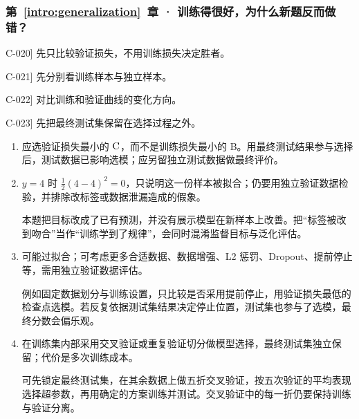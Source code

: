 \subsubsection*{第~\ref*{intro:generalization}~章 · 训练得很好，为什么新题反而做错？}
\begin{answerhints}
\item[\hyperref[exercise:validation-checkpoint-choice]{C-020}] \leavevmode{}\label{hint:validation-checkpoint-choice}先只比较验证损失，不用训练损失决定胜者。
\item[\hyperref[exercise:zero-loss-generalization]{C-021}] \leavevmode{}\label{hint:zero-loss-generalization}先分别看训练样本与独立样本。
\item[\hyperref[exercise:validation-overfitting]{C-022}] \leavevmode{}\label{hint:validation-overfitting}对比训练和验证曲线的变化方向。
\item[\hyperref[exercise:small-data-validation]{C-023}] \leavevmode{}\label{hint:small-data-validation}先把最终测试集保留在选择过程之外。
\end{answerhints}
\begin{enumerate}[label={},leftmargin=4.8em,itemsep=4pt]
\item[\textbf{\hyperref[exercise:validation-checkpoint-choice]{C-020.}}] \leavevmode{}\label{solution:C-020}\label{solution:validation-checkpoint-choice}应选验证损失最小的 $\boldsymbol{\text{C}}$，而不是训练损失最小的 B。用最终测试结果参与选择后，测试数据已影响选模；应另留独立测试数据做最终评价。
\item[\textbf{\hyperref[exercise:zero-loss-generalization]{C-021.}}] \leavevmode{}\label{solution:C-021}\label{solution:zero-loss-generalization}$y=4$ 时 $\tfrac12(4-4)^2=0$，只说明这一份样本被拟合；仍要用独立验证数据检验，并排除改标签或数据泄漏造成的假象。\par 本题把目标改成了已有预测，并没有展示模型在新样本上改善。把“标签被改到吻合”当作“训练学到了规律”，会同时混淆监督目标与泛化评估。
\item[\textbf{\hyperref[exercise:validation-overfitting]{C-022.}}] \leavevmode{}\label{solution:C-022}\label{solution:validation-overfitting}可能过拟合；可考虑更多合适数据、数据增强、L2 惩罚、Dropout、提前停止等，需用独立验证数据评估。\par 例如固定数据划分与训练设置，只比较是否采用提前停止，用验证损失最低的检查点选模。若反复依据测试集结果决定停止位置，测试集也参与了选模，最终分数会偏乐观。
\item[\textbf{\hyperref[exercise:small-data-validation]{C-023.}}] \leavevmode{}\label{solution:C-023}\label{solution:small-data-validation}在训练集内部采用交叉验证或重复验证切分做模型选择，最终测试集独立保留；代价是多次训练成本。\par 可先锁定最终测试集，在其余数据上做五折交叉验证，按五次验证的平均表现选择超参数，再用确定的方案训练并测试。交叉验证中的每一折仍要保持训练与验证分离。
\end{enumerate}
